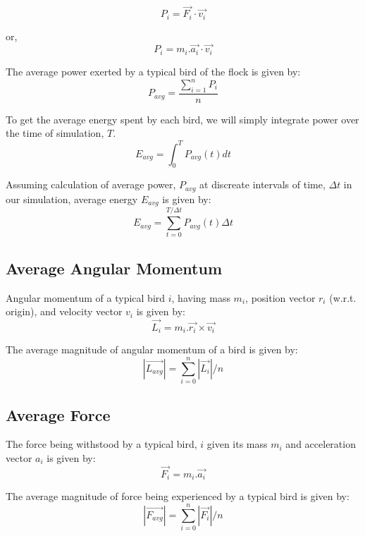 \documentclass[a4paper,12pt,openany]{book}
\begin{document}
\begin{equation}
P_i = \vec{F_i}\cdot\vec{v_i}
\end{equation}

or, \begin{equation}
P_i = m_i.\vec{a_i}\cdot\vec{v_i}
\end{equation}

The average power exerted by a typical bird of the flock is given by:
\begin{equation}
P_{avg} = \frac{\sum_{i=1}^{n} P_i}{n}
\end{equation}

To get the average energy spent by each bird, we will simply integrate power over the time of simulation, $T$. 
\begin{equation}
E_{avg} = \int_{0}^{T} P_{avg}(t) dt
\end{equation}

Assuming calculation of average power, $P_{avg}$ at discreate intervals of time, $\Delta{t}$ in our simulation, average energy $E_{avg}$ is given by:
\begin{equation}
E_{avg} = \sum_{t=0}^{T/\Delta{t}} P_{avg}(t) \Delta{t}
\end{equation}

\subsection*{Average Angular Momentum}
Angular momentum of a typical bird $i$, having mass $m_i$, position vector $r_i$ (w.r.t. origin), and velocity vector $v_i$ is given by:
\begin{equation}
\vec{L_i} = m_i . \vec{r_i} \times \vec{v_i}
\end{equation} 

The average magnitude of angular momentum of a bird is given by:
\begin{equation}
|\vec{L_{avg}}| = \sum_{i=0}^{n} |\vec{L_i}| / n
\end{equation}

\subsection*{Average Force}
The force being withstood by a typical bird, $i$ given its mass $m_i$ and acceleration vector $a_i$ is given by:
\begin{equation}
\vec{F_i} = m_i . \vec{a_i}
\end{equation}

The average magnitude of force being experienced by a typical bird is given by:
\begin{equation}
|\vec{F_{avg}}| = \sum_{i=0}^{n} |\vec{F_i}| / n
\end{equation}
\end{document}
